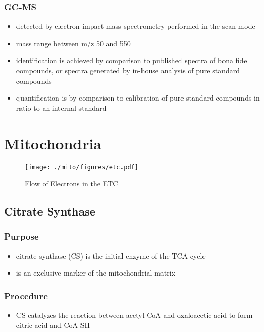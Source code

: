 \documentclass[12pt]{scrartcl}
\begin{document}
\subsubsection{GC-MS}
\label{sec:org9c43d31}
\begin{itemize}
\item detected by electron impact mass spectrometry performed in the scan mode
\item mass range between m/z 50 and 550
\item identification is achieved by comparison to published spectra of
bona fide compounds, or spectra generated by in-house analysis of
pure standard compounds
\item quantification is by comparison to calibration of pure standard
compounds in ratio to an internal standard
\end{itemize}
\section{Mitochondria}
\label{sec:orgbcf3a58}
\begin{figure}[htbp]
\centering
\texttt{[image: ./mito/figures/etc.pdf]}
\caption{\label{fig:org40a094e}Flow of Electrons in the ETC}
\end{figure}

\subsection{Citrate Synthase}
\label{sec:orgc791aba}
\subsubsection{Purpose}
\label{sec:org28f8935}
\begin{itemize}
\item citrate synthase (CS) is the initial enzyme of the TCA cycle
\item is an exclusive marker of the mitochondrial matrix
\end{itemize}
\subsubsection{Procedure}
\label{sec:orga40c4a3}
\begin{itemize}
\item CS catalyzes the reaction between acetyl-CoA and oxaloacetic acid to
form citric acid and CoA-SH
\end{itemize}

\end{document}
